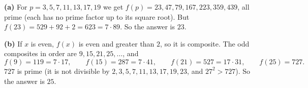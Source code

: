 \textbf{(a)} For $p=3,5,7,11,13,17,19$ we get $f(p)=23,47,79,167,223,359,439$, all prime (each has no prime factor up to its square root). But $f(23)=529+92+2=623=7\cdot89$. So the answer is $\boxed{23}$.

\textbf{(b)} If $x$ is even, $f(x)$ is even and greater than $2$, so it is composite. The odd composites in order are $9,15,21,25,\dots$, and
\[f(9)=119=7\cdot17,\qquad f(15)=287=7\cdot41,\qquad f(21)=527=17\cdot31,\qquad f(25)=727.\]
$727$ is prime (it is not divisible by $2,3,5,7,11,13,17,19,23$, and $27^2>727$). So the answer is $\boxed{25}$.
